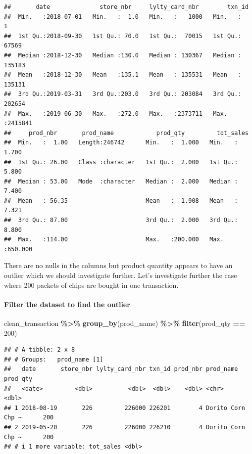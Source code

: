 \documentclass[
]{article}
\newenvironment{Shaded}{\begin{snugshade}}{\end{snugshade}}
\newcommand{\DecValTok}[1]{\textcolor[rgb]{0.00,0.00,0.81}{#1}}
\newcommand{\FunctionTok}[1]{\textcolor[rgb]{0.13,0.29,0.53}{\textbf{#1}}}
\newcommand{\NormalTok}[1]{#1}
\newcommand{\SpecialCharTok}[1]{\textcolor[rgb]{0.81,0.36,0.00}{\textbf{#1}}}
\begin{document}
\begin{verbatim}
##       date              store_nbr     lylty_card_nbr        txn_id       
##  Min.   :2018-07-01   Min.   :  1.0   Min.   :   1000   Min.   :      1  
##  1st Qu.:2018-09-30   1st Qu.: 70.0   1st Qu.:  70015   1st Qu.:  67569  
##  Median :2018-12-30   Median :130.0   Median : 130367   Median : 135183  
##  Mean   :2018-12-30   Mean   :135.1   Mean   : 135531   Mean   : 135131  
##  3rd Qu.:2019-03-31   3rd Qu.:203.0   3rd Qu.: 203084   3rd Qu.: 202654  
##  Max.   :2019-06-30   Max.   :272.0   Max.   :2373711   Max.   :2415841  
##     prod_nbr       prod_name            prod_qty         tot_sales      
##  Min.   :  1.00   Length:246742      Min.   :  1.000   Min.   :  1.700  
##  1st Qu.: 26.00   Class :character   1st Qu.:  2.000   1st Qu.:  5.800  
##  Median : 53.00   Mode  :character   Median :  2.000   Median :  7.400  
##  Mean   : 56.35                      Mean   :  1.908   Mean   :  7.321  
##  3rd Qu.: 87.00                      3rd Qu.:  2.000   3rd Qu.:  8.800  
##  Max.   :114.00                      Max.   :200.000   Max.   :650.000
\end{verbatim}

There are no nulls in the columns but product quantity appears to have
an outlier which we should investigate further. Let's investigate
further the case where 200 packets of chips are bought in one
transaction.

\hypertarget{filter-the-dataset-to-find-the-outlier}{%
\paragraph{Filter the dataset to find the
outlier}\label{filter-the-dataset-to-find-the-outlier}}

\begin{Shaded}
\begin{Highlighting}[]
\NormalTok{clean\_transaction }\SpecialCharTok{\%\textgreater{}\%} \FunctionTok{group\_by}\NormalTok{(prod\_name) }\SpecialCharTok{\%\textgreater{}\%} \FunctionTok{filter}\NormalTok{(prod\_qty }\SpecialCharTok{==} \DecValTok{200}\NormalTok{)}
\end{Highlighting}
\end{Shaded}

\begin{verbatim}
## # A tibble: 2 x 8
## # Groups:   prod_name [1]
##   date       store_nbr lylty_card_nbr txn_id prod_nbr prod_name         prod_qty
##   <date>         <dbl>          <dbl>  <dbl>    <dbl> <chr>                <dbl>
## 1 2018-08-19       226         226000 226201        4 Dorito Corn Chp ~      200
## 2 2019-05-20       226         226000 226210        4 Dorito Corn Chp ~      200
## # i 1 more variable: tot_sales <dbl>
\end{verbatim}
\end{document}
